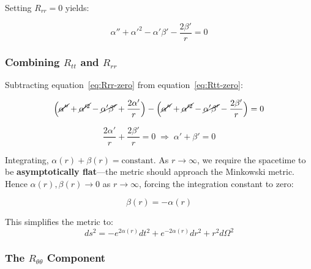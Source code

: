\documentclass[12pt]{article}
\theoremstyle{definition}
\theoremstyle{remark}
\begin{document}
Setting $R_{rr} = 0$ yields:

\begin{equation}\label{eq:Rrr-zero}
  \boxed{\;\alpha'' + \alpha'^{2} - \alpha'\beta' - \frac{2\beta'}{r} = 0\;}
\end{equation}

\subsubsection{Combining \texorpdfstring{$R_{tt}$ and $R_{rr}$}{R\_tt and R\_rr}}

Subtracting equation~\eqref{eq:Rrr-zero} from equation~\eqref{eq:Rtt-zero}:

\begin{equation}
  \Big(\cancel{\alpha''} + \cancel{\alpha'^{2}} - \cancel{\alpha'\beta'} + \frac{2\alpha'}{r}\Big)
  - \Big(\cancel{\alpha''} + \cancel{\alpha'^{2}} - \cancel{\alpha'\beta'} - \frac{2\beta'}{r}\Big) = 0
\end{equation}

\begin{equation}\label{eq:alpha-beta-relation}
  \boxed{\;\frac{2\alpha'}{r} + \frac{2\beta'}{r} = 0 \;\Longrightarrow\; \alpha' + \beta' = 0\;}
\end{equation}

Integrating, $\alpha(r) + \beta(r) = \text{constant}$. As $r \to \infty$, we require the spacetime to be \textbf{asymptotically flat}---the metric should approach the Minkowski metric. Hence $\alpha(r), \beta(r) \to 0$ as $r \to \infty$, forcing the integration constant to zero:

\begin{equation}\label{eq:beta-equals-minus-alpha}
  \boxed{\;\beta(r) = -\alpha(r)\;}
\end{equation}

This simplifies the metric to:
\begin{equation}
  ds^{2} = -e^{2\alpha(r)}dt^{2} + e^{-2\alpha(r)}dr^{2} + r^{2}d\Omega^{2}
\end{equation}

\subsubsection{The \texorpdfstring{$R_{\theta\theta}$}{R\_thetatheta} Component}
\end{document}
